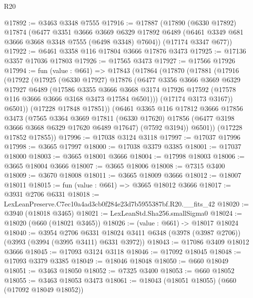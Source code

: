 \begin{lexlean}{R20}
\begin{coremodule}
@17892 := @3463 @3348 @7555
@17916 := @17887
    (@17890
      (@6330 @17892)
      @17874
      (@6477
        @3351
        @3666
        @3669
        @6329
        @17892
        @6489
        (@6461 @3349 @681 @3666 @3668 @3348 @7555 (@6498 @3348) @7604))
      (@17174 @3347 @677))
@17922 := @6461 @3358 @116 @17804 @3666 @17876 @3473
@17925 := @17136 @3357 @17036 @17803
@17926 := @17565 @3473
@17927 := @17566 @17926
@17994 := fun (value : @661) =>
  @17843
    (@17864
      (@17870
        (@17881
          (@17916
            (@17922
              (@17925
                (@6330 @17927)
                @17876
                (@6477
                  @3356
                  @3666
                  @3669
                  @6329
                  @17927
                  @6489
                  (@17586
                    @3355
                    @3666
                    @3668
                    @3174
                    @17926
                    @17592
                    (@17578 @116 @3666 @3666 @3168 @3473 @17584 @6501)))
                (@17174 @3173 @3167))
              @6501))
          (@17228 @17848 @17851))
        (@6461
          @3365
          @116
          @17812
          @3666
          @17856
          @3473
          (@7565
            @3364
            @3669
            @17811
            (@6330 @17620)
            @17856
            (@6477 @3198 @3666 @3668 @6329 @17620 @6489 @17647)
            (@7592 @3194))
          @6501))
      (@17228 @17852 @17855))
@17996 := @17038 @3124 @3118
@17997 := @17037 @17996
@17998 := @3665 @17997
@18000 := @17038 @3379 @3385
@18001 := @17037 @18000
@18003 := @3665 @18001 @3666
@18004 := @17998 @18003
@18006 := @3665 @18004 @3666
@18007 := @3665 @18006
@18008 := @7315 @3400
@18009 := @3670 @18008
@18011 := @3665 @18009 @3666
@18012 := @18007 @18011
@18015 := fun (value : @661) => @3665 @18012 @3666
@18017 := @3931 @2706 @6331
@18018 := LexLeanPreserve.C7ec10a4ad3cb0f284e23d7b5955387bf.R20.__fits_42
@18020 := @3940 (@18018 @3465)
@18021 := LexLeanStd.Sha256.smallSigma0
@18024 := @18020 (@660 (@18021 @3465))
@18026 := (value : @661) -> @18017 @18024
@18040 := @3954
    @2706
    @6331
    @18024
    @3411
    @6348
    (@3978 (@3987 @2706))
    (@3993 (@3994 (@3995 @3411) @6331 @3972))
@18043 := @17086 @3409 @18012 @3666
@18045 := @17093 @3124 @3118
@18046 := @17092 @18045
@18048 := @17093 @3379 @3385
@18049 := @18046 @18048
@18050 := @660 @18049
@18051 := @3463 @18050
@18052 := @7325 @3400
@18053 := @660 @18052
@18055 := @3463 @18053 @3473
@18061 := @18043 (@18051 @18055) (@660 (@17092 @18049 @18052))

\end{coremodule}
\end{lexlean}
